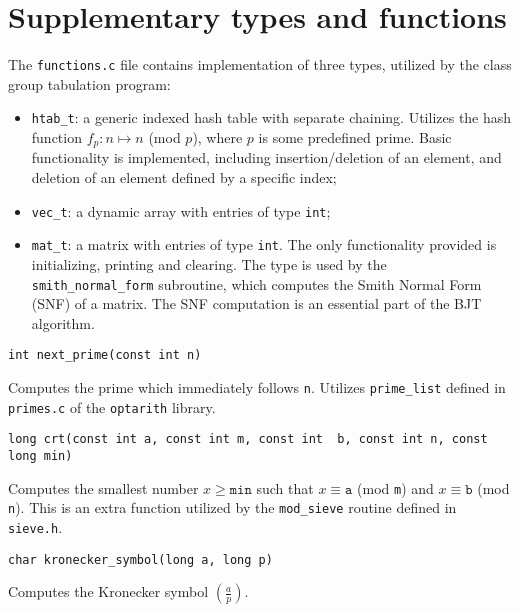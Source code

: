 \documentclass[a4paper,10pt]{article}
\newcommand{\code}{\lstinline}
\begin{document}
\section{Supplementary types and functions} \label{subsec:clgrp_extra}

The \code{functions.c} file contains implementation of three types, utilized by the class group tabulation program:

\begin{itemize}
\item \code{htab_t}: a generic indexed hash table with separate chaining. Utilizes the hash function $f_p \colon n \mapsto n$ (mod $p$), where $p$ is some predefined prime. Basic functionality is implemented, including insertion/deletion of an element, and deletion of an element defined by a specific index;

\item \code{vec_t}: a dynamic array with entries of type \code{int};

\item \code{mat_t}: a matrix with entries of type \code{int}. The only functionality provided is initializing, printing and clearing. The type is used by the \code{smith_normal_form} subroutine, which computes the Smith Normal Form (SNF) of a matrix. The SNF computation is an essential part of the BJT algorithm.
\end{itemize}

\begin{lstlisting}
int next_prime(const int n)
\end{lstlisting}

Computes the prime which immediately follows \code{n}. Utilizes \code{prime_list} defined in \code{primes.c} of the \code{optarith} library.

\begin{lstlisting}
long crt(const int a, const int m, const int  b, const int n, const long min)
\end{lstlisting}

Computes the smallest number $x \geq \texttt{min}$ such that $x \equiv \texttt{a}$ (mod \texttt{m}) and $x \equiv \texttt{b}$ (mod \texttt{n}). This is an extra function utilized by the \code{mod_sieve} routine defined in \code{sieve.h}.

\begin{lstlisting}
char kronecker_symbol(long a, long p)
\end{lstlisting}

Computes the Kronecker symbol $\left(\frac{a}{p}\right)$.
\end{document}
